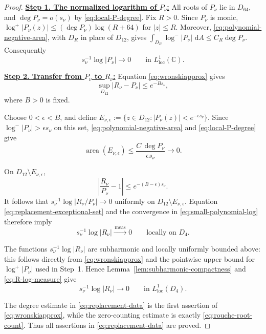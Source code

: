 \documentclass[12pt,letterpaper,reqno]{amsart}
\theoremstyle{definition}
\numberwithin{equation}{section}
\newcommand{\C}{\mathbb C}
\newcommand{\dA}{\,\mathrm dA}
\newcommand{\loc}{\mathrm{loc}}
\newcommand{\convmeas}{\xrightarrow{\,\mathrm{meas}\,}}
\DeclareMathOperator{\meas}{area}
\begin{document}
\begin{proof}

\medskip\noindent
\textbf{\underline{Step 1. The normalized logarithm of \(P_\nu\):}}
All roots of \(P_\nu\) lie in \(D_{64}\), and
\(\deg P_\nu=o(s_\nu)\) by \eqref{eq:local-P-degree}.
Fix \(R>0\). Since \(P_\nu\) is monic,
\(\log^+|P_\nu(z)|
 \leq(\deg P_\nu)\log(R+64)\)
for \(|z|\leq R\). Moreover,
\eqref{eq:polynomial-negative-area}, with \(D_R\) in place of
\(D_{12}\), gives
\(\int_{D_R}\log^-|P_\nu|\,\dA
 \leq C_R\deg P_\nu\).
Consequently
\begin{equation}\label{eq:small-polynomial-log}
 s_\nu^{-1}\log|P_\nu|
 \longrightarrow0
 \qquad\text{in }L^1_{\loc}(\C).
\end{equation}


\medskip\noindent
\textbf{\underline{Step 2. Transfer from \(P_\nu\) to \(R_\nu\):}}
Equation \eqref{eq:wronskiapprox} gives
\[
 \sup_{D_{12}}|R_\nu-P_\nu|
 \leq e^{-Bs_\nu},
\]
where \(B>0\) is fixed.

Choose \(0<\epsilon<B\), and define
\(E_{\nu,\epsilon}
 :=\{z\in D_{12}:|P_\nu(z)|<e^{-\epsilon s_\nu}\}\).
Since
\(\log^-|P_\nu|>\epsilon s_\nu\) on this set,
\eqref{eq:polynomial-negative-area} and
\eqref{eq:local-P-degree} give
\begin{equation}\label{eq:replacement-exceptional-set}
 \meas(E_{\nu,\epsilon})
 \leq
 \frac{C\,\deg P_\nu}{\epsilon s_\nu}
 \longrightarrow0.
\end{equation}

On \(D_{12}\setminus E_{\nu,\epsilon}\),
\[
 \left|\frac{R_\nu}{P_\nu}-1\right|
 \leq
 e^{-(B-\epsilon)s_\nu}.
\]
It follows that
\(s_\nu^{-1}\log|R_\nu/P_\nu|\to0\) uniformly on
\(D_{12}\setminus E_{\nu,\epsilon}\). Equation
\eqref{eq:replacement-exceptional-set} and the convergence in
\eqref{eq:small-polynomial-log} therefore imply
\begin{equation}\label{eq:R-log-measure}
 s_\nu^{-1}\log|R_\nu|
 \convmeas0
 \qquad\text{locally on }D_4.
\end{equation}

The functions \(s_\nu^{-1}\log|R_\nu|\) are subharmonic and locally
uniformly bounded above: this follows directly from
\eqref{eq:wronskiapprox} and the pointwise upper bound for
\(\log^+|P_\nu|\) used in Step~1. Hence
Lemma~\ref{lem:subharmonic-compactness} and
\eqref{eq:R-log-measure} give
\[
 s_\nu^{-1}\log|R_\nu|
 \longrightarrow0
 \qquad\text{in }L^1_{\loc}(D_4).
\]

The degree estimate in \eqref{eq:replacement-data} is the first
assertion of \eqref{eq:wronskiapprox}, while the zero-counting estimate
is exactly \eqref{eq:rouche-root-count}. Thus all assertions in
\eqref{eq:replacement-data} are proved.



\end{proof}
\end{document}
